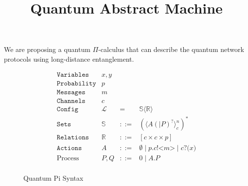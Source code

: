 \documentclass{article}
\title{Quantum Abstract Machine}
\begin{document}
\maketitle

We are proposing a quantum $\Pi$-calculus that can describe the quantum network protocols using long-distance entanglement. 

\newcommand{\qsend}[3]{#1\texttt{.}#2\texttt{!<}#3\texttt{>}}
\newcommand{\qrev}[2]{#1\texttt{?(}#2\texttt{)}}
\newcommand{\qact}[2]{#1.#2}

\newcommand{\qchan}[3]{#1\texttt{[}#2\texttt{]}.#3}
\newcommand{\qchana}[3]{#1\texttt{[}#2\texttt{]}\,@\,#3}

\newcommand{\parp}[2]{#1\,\texttt{@}\,#2}

\newcommand{\parl}[2]{#1\,\texttt{|}\,#2}

\newcommand{\parll}[2]{#1\,\texttt{||}\,#2}



\newcommand{\mcomm}[2]{\texttt{[}#1\texttt{]}#2}

\newcommand{\Ss}{\mathbb{S}}
\newcommand{\Rs}{\mathbb{R}}
\newcommand{\Ps}{\mathbb{P}}
\newcommand{\Path}[1]{<#1> }
\newcommand{\Cfg}[3]{\langle #1\texttt{,}#2\texttt{,}#3 \rangle}
\newcommand{\Seta}[2]{#1\texttt{@}#2}
\newcommand{\PSet}[1]{\texttt{\{}#1\texttt{\}}}

\newcommand{\qcell}[1]{\langle #1 \rangle}
\newcommand{\Cella}[3]{\langle #1 \rangle^{#2}_{#3}}
\newcommand{\Cellb}[3]{\langle #1 \, \;...\rangle^{#2}_{#3}}

\begin{figure}[h]
{\small
  \[\begin{array}{llcl} 
      \texttt{Variables} & x,y \\
      \texttt{Probability} & p\\
      \texttt{Messages} & m\\
    \texttt{Channels} & c\\
      \texttt{Config} & \mathcal{L} & = & \Ss \qcell{\Rs}\\
      \texttt{Sets} & \Ss & ::= & (\langle A (\texttt{|} P )^?\rangle^{n}_{c})^* \\
      \texttt{Relations} & \Rs & ::= & [c \times c \times p] \\
      \texttt{Actions} & A & ::= & \emptyset \mid \qsend{p}{c}{m} \mid \qrev{c}{x} \\
      \text{Process} & P,Q & ::= & 0 \mid A.P \\
    \end{array}
  \]
}
\caption{Quantum Pi Syntax}
  \label{fig:q-pi-syntax}
\end{figure}
\end{document}
